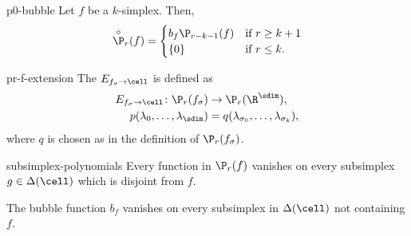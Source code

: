 \begin{Lemma}{p0-bubble}
  Let $f$ be a $k$-simplex. Then,
  \begin{gather}
    \overset{\circ}{\P}_r(f) =
    \begin{cases}
      b_f \P_{r-k-1}(f) &\text{if } r\ge k+1\\
      \{0\} &\text{if } r \le k.
    \end{cases}
  \end{gather}
\end{Lemma}


\begin{Definition}{pr-f-extension}
  The  $E_{f_\sigma\to\cell}$ is defined as
  \begin{gather}
    \begin{split}
      E_{f_\sigma\to\cell}\colon \P_r(f_\sigma) &\to \P_r(\R^\sdim),\\
      p(\lambda_0,\dots,\lambda_\sdim) &= q(\lambda_{\sigma_0},\dots,\lambda_{\sigma_k}),
    \end{split}
  \end{gather}
  where $q$ is chosen as in the definition of $\P_r(f_\sigma)$.
\end{Definition}

\begin{Lemma}{subsimplex-polynomials}
  Every function in $\P_r(f)$ vanishes on every subsimplex
  $g\in\Delta(\cell)$ which is disjoint from $f$.

  The bubble function $b_f$ vanishes on every subsimplex in
  $\Delta(\cell)$ not containing $f$.
\end{Lemma}

